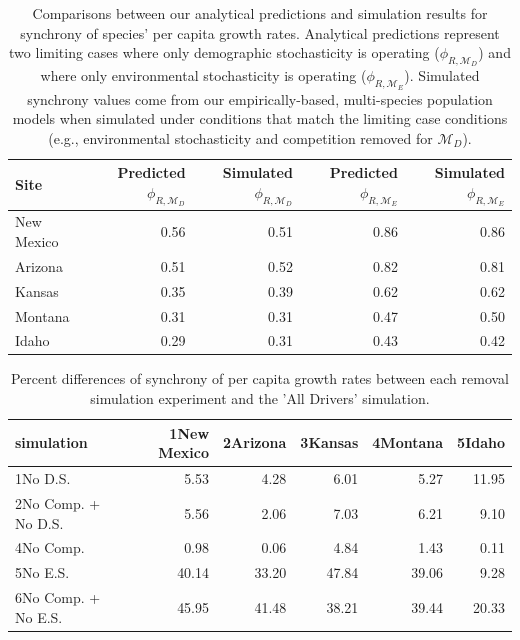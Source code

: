 \documentclass[12pt,]{article}
\begin{document}
\newpage{}

\begin{table}[ht]
\centering
\caption{Comparisons between our analytical predictions and simulation results for synchrony of species' per capita growth rates. Analytical predictions represent two limiting cases where only demographic stochasticity is operating ($\phi_{R,\mathcal{M}_D}$) and where only environmental stochasticity is operating ($\phi_{R,\mathcal{M}_E}$). Simulated synchrony values come from our empirically-based, multi-species population models when simulated under conditions that match the limiting case conditions (e.g., environmental stochasticity and competition removed for $\mathcal{M}_D$).} 
{\normalsize
\begin{tabular}{lrrrr}
  \hline
Site & Predicted $\phi_{R,\mathcal{M}_D}$ & Simulated $\phi_{R,\mathcal{M}_D}$ & Predicted $\phi_{R,\mathcal{M}_E}$ & Simulated $\phi_{R,\mathcal{M}_E}$ \\ 
  \hline
New Mexico & 0.56 & 0.51 & 0.86 & 0.86 \\ 
  Arizona & 0.51 & 0.52 & 0.82 & 0.81 \\ 
  Kansas & 0.35 & 0.39 & 0.62 & 0.62 \\ 
  Montana & 0.31 & 0.31 & 0.47 & 0.50 \\ 
  Idaho & 0.29 & 0.31 & 0.43 & 0.42 \\ 
   \hline
\end{tabular}
}
\end{table}

\newpage{}

\begin{table}[ht]
\centering
\caption{Percent differences of synchrony of per capita growth rates between each removal simulation experiment and the 'All Drivers' simulation.} 
\begin{tabular}{lrrrrr}
  \hline
simulation & 1New Mexico & 2Arizona & 3Kansas & 4Montana & 5Idaho \\ 
  \hline
1No D.S. & 5.53 & 4.28 & 6.01 & 5.27 & 11.95 \\ 
  2No Comp. + No D.S. & 5.56 & 2.06 & 7.03 & 6.21 & 9.10 \\ 
  4No Comp. & 0.98 & 0.06 & 4.84 & 1.43 & 0.11 \\ 
  5No E.S. & 40.14 & 33.20 & 47.84 & 39.06 & 9.28 \\ 
  6No Comp. + No E.S. & 45.95 & 41.48 & 38.21 & 39.44 & 20.33 \\ 
   \hline
\end{tabular}
\end{table}
\end{document}
